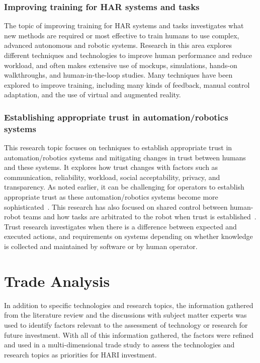 \subsubsection{Improving training for HAR systems and tasks}
The topic of improving training for HAR systems and tasks investigates what new methods are required or most effective to train humans to use complex, advanced autonomous and robotic systems.
Research in this area explores different techniques and technologies to improve human performance and reduce workload, and often makes extensive use of mockups, simulations, hands-on walkthroughs, and human-in-the-loop studies.
Many techniques have been explored to improve training, including many kinds of feedback, manual control adaptation, and the use of virtual and augmented reality.

\subsubsection{Establishing appropriate trust in automation/robotics systems}
This research topic focuses on techniques to establish appropriate trust in automation/robotics systems and mitigating changes in trust between humans and these systems.
It explores how trust changes with factors such as communication, reliability, workload, social acceptability, privacy, and transparency.
As noted earlier, it can be challenging for operators to establish appropriate trust as these automation/robotics systems become more sophisticated~\citep{chen_humanagent_2014}.
This research has also focused on shared control between human-robot teams and how tasks are arbitrated to the robot when trust is established~\citep{losey_review_2018}.
Trust research investigates when there is a difference between expected and executed actions, and requirements on systems depending on whether knowledge is collected and maintained by software or by human operator.

\section{Trade Analysis}
In addition to specific technologies and research topics, the information gathered from the literature review and the discussions with subject matter experts was used to identify factors relevant to the assessment of technology or research for future investment.
With all of this information gathered, the factors were refined and used in a multi-dimensional trade study to assess the technologies and research topics as priorities for HARI investment.

